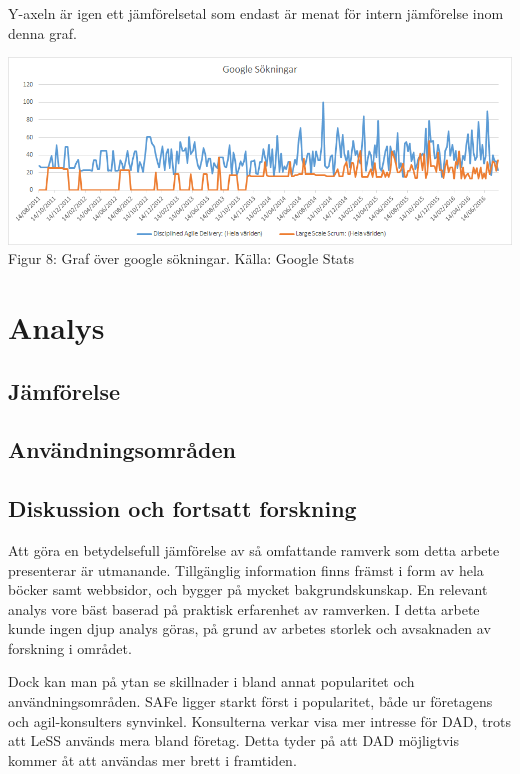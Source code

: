 		Y-axeln är igen ett jämförelsetal som endast är menat för intern jämförelse inom denna graf.
		\begin{center}
			\includegraphics{Grafer/Google_sokningar_dad_less.png}
			\\ Figur 8: Graf över google sökningar. Källa: Google Stats \cite{google_stats_dad_less}
		\end{center}
		
		
	
\section{Analys}

	\subsection{Jämförelse}
	
	
	\subsection{Användningsområden}
	
	
	
	\subsection{Diskussion och fortsatt forskning}
		Att göra en betydelsefull jämförelse av så omfattande ramverk som detta arbete presenterar är utmanande. Tillgänglig information finns främst i form av hela böcker samt webbsidor, och bygger på mycket bakgrundskunskap. En relevant analys vore bäst baserad på praktisk erfarenhet av ramverken.
		I detta arbete kunde ingen djup analys göras, på grund av arbetes storlek och avsaknaden av forskning i området.
		
		
		Dock kan man på ytan se skillnader i bland annat popularitet och användningsområden. SAFe ligger starkt först i popularitet, både ur företagens och agil-konsulters synvinkel.
		Konsulterna verkar visa mer intresse för DAD, trots att LeSS används mera bland företag. Detta tyder på att DAD möjligtvis kommer åt att användas mer brett i framtiden.
		
